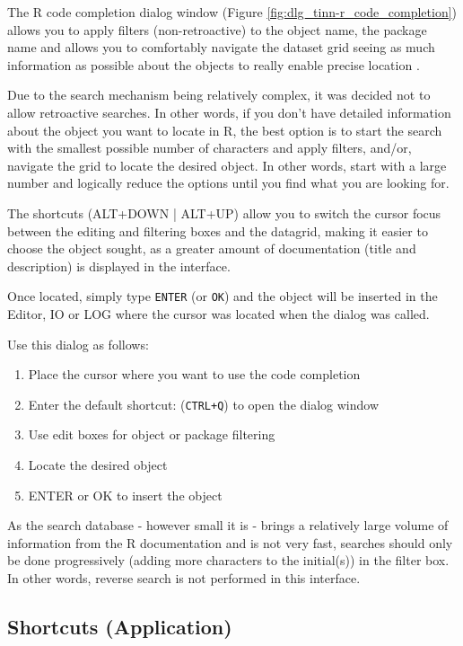 The R code completion dialog window (Figure \ref{fig:dlg_tinn-r_code_completion}) allows you to apply filters
(non-retroactive) to the object name, the package name and allows you to comfortably navigate the dataset
grid seeing as much information as possible about the objects to really enable precise location .

Due to the search mechanism being relatively complex, it was decided not to allow retroactive searches.
In other words, if you don't have detailed information about the object you want to locate in R, the best
option is to start the search with the smallest possible number of characters and apply filters, and/or,
navigate the grid to locate the desired object. In other words, start with a large number and logically
reduce the options until you find what you are looking for.

The shortcuts (ALT+DOWN | ALT+UP) allow you to switch the cursor focus between the editing and filtering
boxes and the datagrid, making it easier to choose the object sought, as a greater amount of documentation
(title and description) is displayed in the interface.

Once located, simply type \texttt{ENTER} (or \texttt{OK}) and the object will be inserted in the Editor,
IO or LOG where the cursor was located when the dialog was called.

Use this dialog as follows:
\begin{enumerate}
  \item Place the cursor where you want to use the code completion
  \item Enter the default shortcut: (\texttt{CTRL+Q}) to open the dialog window
  \item Use edit boxes for object or package filtering
  \item Locate the desired object
  \item ENTER or OK to insert the object
\end{enumerate}

As the search database - however small it is - brings a relatively large volume of information
from the R documentation and is not very fast, searches should only be done progressively
(adding more characters to the initial(s)) in the filter box. In other words, reverse search
is not performed in this interface.


\hypertarget{dlg_skh_map_shortcuts}{}
\subsection{Shortcuts (Application)}

